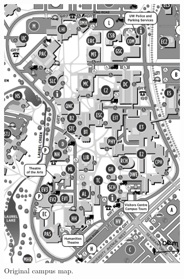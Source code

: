 \begin{figure}[!htbp]
    \centering
    \begin{subfigure}[t]{0.4\textwidth}
        \includegraphics[width=\linewidth]{images/campus_map.PNG}
        \caption{Original campus map.}
    \end{subfigure}
    \hfill
    \begin{subfigure}[t]{0.4\textwidth}

\end{subfigure}
\end{figure}
